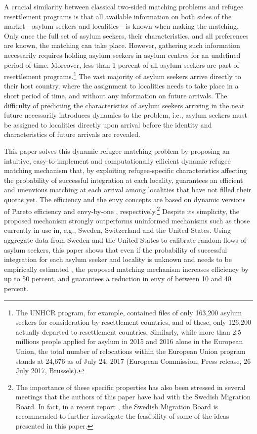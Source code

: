 \documentclass[12pt,fleqn]{article}
\begin{document}
A crucial similarity between classical two-sided matching problems and refugee resettlement programs is that all available information on both sides of the market---asylum seekers and localities---is known when making the matching. Only once the full set of asylum seekers, their characteristics, and all preferences are known, the matching can take place. However, gathering such information necessarily requires holding asylum seekers in asylum centres for an undefined period of time. Moreover, less than 1 percent of all asylum seekers are part of resettlement programs.\footnote{The UNHCR program, for example, contained files of only 163,200 asylum seekers for consideration by resettlement countries, and of these, only 126,200 actually departed to resettlement countries. Similarly, while more than 2.5 millions people applied for asylum in 2015 and 2016 alone in the European Union, the total number of relocations within the European Union program stands at 24,676 as of July 24, 2017 (European Commission, Press release, 26 July 2017, Brussels).} The vast majority of asylum seekers arrive directly to their host country, where the assignment to localities needs to take place in a short period of time, and without any information on future arrivals. The difficulty of predicting the characteristics of asylum seekers arriving in the near future necessarily introduces dynamics to the problem, i.e., asylum seekers must be assigned to localities directly upon arrival before the identity and characteristics of future arrivals are revealed.

This paper solves this dynamic refugee matching problem by proposing an intuitive, easy-to-implement and computationally efficient dynamic refugee matching mechanism that, by exploiting refugee-specific characteristics affecting the probability of successful integration at each locality, guarantees an efficient and unenvious matching at each arrival among localities that have not filled their quotas yet. The efficiency and the envy concepts are based on dynamic versions of Pareto efficiency and envy-by-one \citep{bib:Budish}, respectively.\footnote{The importance of these specific properties has also been stressed in several meetings that the authors of this paper have had with the Swedish Migration Board. In fact, in a recent report \citep[Swedish Government,][]{SOU2018}, the Swedish Migration Board is recommended to further investigate the feasibility of some of the ideas presented in this paper.} Despite its simplicity, the proposed mechanism strongly outperforms uninformed mechanisms such as those currently in use in, e.g., Sweden, Switzerland and the United States. Using aggregate data from Sweden and the United States to calibrate random flows of asylum seekers, this paper shows that even if the probability of successful integration for each asylum seeker and locality is unknown and needs to be empirically estimated \citep[as in][]{bib:BansakEtAl}, the proposed matching mechanism increases efficiency by up to 50 percent, and guarantees a reduction in envy of between 10 and 40 percent.
\end{document}
